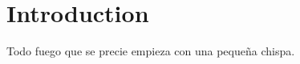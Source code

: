 
\chapter*{Introduction} %
\label{Introduction}


Todo fuego que se precie empieza con una pequeña chispa.
